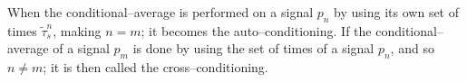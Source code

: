 When the conditional--average is performed on a signal $p_{n}$ by using its own set of times ${\tilde{\tau}^n_{s}}$, making $n = m$; it becomes the auto--conditioning. If the conditional--average of a signal $p_{m}$ is done by using the set of times of a signal $p_{n}$, and so $n \neq m$; it is then called the cross--conditioning. 


